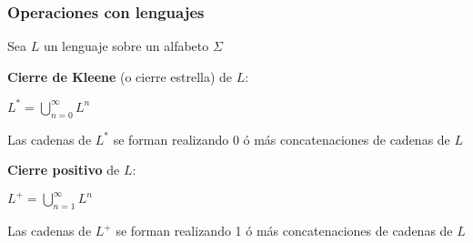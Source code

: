 \begin{frame}
  \frametitle{Operaciones con lenguajes}
			  Sea $L$ un lenguaje sobre un alfabeto $\Sigma$

      \pause
      \begin{defi}
			\textbf{Cierre de Kleene} (o cierre estrella) de $L$:

			$L ^* = \displaystyle\bigcup_{n=0}^{\infty} L^n$
      \end{defi}

			\pause
			Las cadenas de $L^*$ se forman realizando 0 ó más concatenaciones de cadenas de $L$

      \pause
      \begin{defi}
			\textbf{Cierre positivo} de $L$:

			$L ^+ = \displaystyle\bigcup_{n=1}^{\infty} L^n$
			\end{defi}

			 Las cadenas de $L^+$ se forman realizando 1 ó más concatenaciones de cadenas de $L$


\end{frame}
